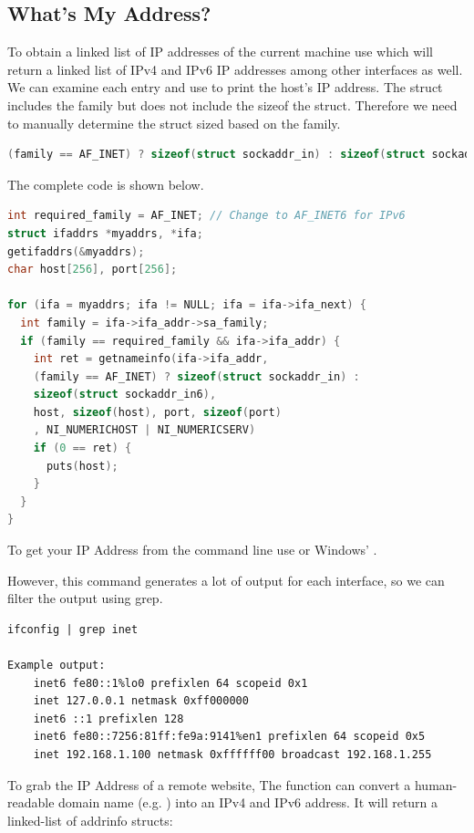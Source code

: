 \subsection{What's My Address?}

To obtain a linked list of IP addresses of the current machine use  which will return a linked list of IPv4 and IPv6 IP addresses among other interfaces as well.
We can examine each entry and use  to print the host's IP address.
The  struct includes the family but does not include the sizeof the struct.
Therefore we need to manually determine the struct sized based on the family.

\begin{lstlisting}[language=C]
(family == AF_INET) ? sizeof(struct sockaddr_in) : sizeof(struct sockaddr_in6)
\end{lstlisting}

The complete code is shown below.

\begin{lstlisting}[language=C]
int required_family = AF_INET; // Change to AF_INET6 for IPv6
struct ifaddrs *myaddrs, *ifa;
getifaddrs(&myaddrs);
char host[256], port[256];

for (ifa = myaddrs; ifa != NULL; ifa = ifa->ifa_next) {
  int family = ifa->ifa_addr->sa_family;
  if (family == required_family && ifa->ifa_addr) {
    int ret = getnameinfo(ifa->ifa_addr,
    (family == AF_INET) ? sizeof(struct sockaddr_in) :
    sizeof(struct sockaddr_in6),
    host, sizeof(host), port, sizeof(port)
    , NI_NUMERICHOST | NI_NUMERICSERV)
    if (0 == ret) {
      puts(host);
    }
  }
}
\end{lstlisting}

To get your IP Address from the command line use  or Windows' .

However, this command generates a lot of output for each interface, so we can filter the output using grep.

\begin{lstlisting}
ifconfig | grep inet

Example output:
    inet6 fe80::1%lo0 prefixlen 64 scopeid 0x1
    inet 127.0.0.1 netmask 0xff000000
    inet6 ::1 prefixlen 128
    inet6 fe80::7256:81ff:fe9a:9141%en1 prefixlen 64 scopeid 0x5
    inet 192.168.1.100 netmask 0xffffff00 broadcast 192.168.1.255
\end{lstlisting}

To grab the IP Address of a remote website, The function  can convert a human-readable domain name (e.g. ) into an IPv4 and IPv6 address.
It will return a linked-list of addrinfo structs:

